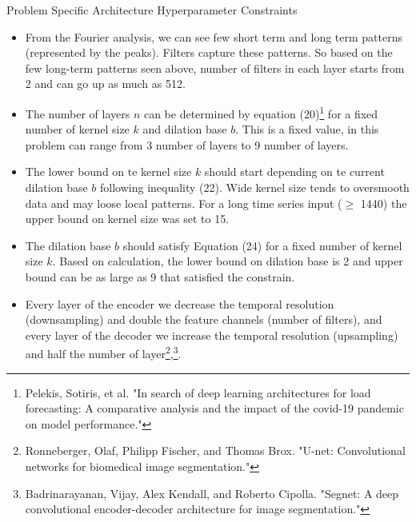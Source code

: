 \documentclass[8pt,xcolor=dvipsnames,compress]{beamer}
\begin{document}
\begin{frame}{Problem Specific Architecture Hyperparameter Constraints}
\scriptsize
\begin{itemize}
\item From the Fourier analysis, we can see few short term and long term patterns (represented by the peaks). Filters capture these patterns. So based on the few long-term patterns seen above, number of filters in each layer starts from 2 and can go up as much as 512.\\
\item The number of layers $n$ can be determined by equation (20)\footnote{Pelekis, Sotiris, et al. "In search of deep learning architectures for load forecasting: A comparative analysis and the impact of the covid-19 pandemic on model performance."} for a fixed number of kernel size $k$ and dilation base $b$. This is a fixed value, in this problem can range from 3 number of layers to 9 number of layers.
\item The lower bound on te kernel size $k$ should start depending on te current dilation base $b$ following inequality (22). Wide kernel size tends to oversmooth data and may loose local patterns. For a long time series input ($\ge$ 1440) the upper bound on kernel size was set to 15. 
\item The dilation base $b$ should satisfy Equation (24) for a fixed number of kernel size $k$. Based on calculation, the lower bound on dilation base is 2 and upper bound can be as large as 9 that satisfied the constrain. 
\item Every layer of the encoder we decrease the temporal resolution (downsampling) and double the feature channels (number of filters), and every layer of the decoder we increase the temporal resolution (upsampling) and half the number of layer\footnote{Ronneberger, Olaf, Philipp Fischer, and Thomas Brox. "U-net: Convolutional networks for biomedical image segmentation."},\footnote{Badrinarayanan, Vijay, Alex Kendall, and Roberto Cipolla. "Segnet: A deep convolutional encoder-decoder architecture for image segmentation."}.\\
\end{itemize}
\end{frame}
\end{document}
